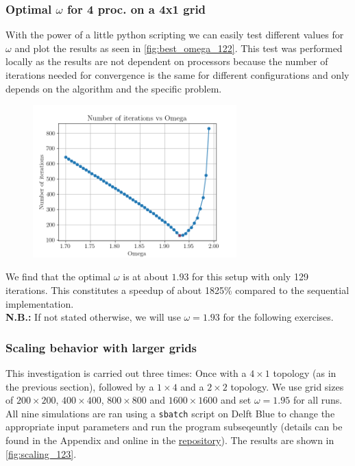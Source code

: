 \subsubsection{Optimal $\omega$ for 4 proc. on a 4x1 grid}
\label{subsec:optimal_omega}
With the power of a little python scripting we can easily test different values for $\omega$ and plot the results as seen in \autoref{fig:best_omega_122}. This test was performed locally as the results are not dependent on processors because the number of iterations needed for convergence is the same for different configurations and only depends on the algorithm and the specific problem.

\begin{figure}[H]
    \centering
    \includegraphics[width=0.7\textwidth]{../fig/lab1/best_omega_122.png}
    \caption{}
    \label{fig:best_omega_122}
\end{figure}
We find that the optimal $\omega$ is at about $1.93$ for this setup with only 129 iterations. This constitutes a speedup of about 1825\% compared to the sequential implementation. \\

\textbf{N.B.:} If not stated otherwise, we will use $\omega = 1.93$ for the following exercises. 

\subsubsection{Scaling behavior with larger grids}
\label{subsec:scaling}
This investigation is carried out three times: Once with a $4\times 1$ topology (as in the previous section), followed by a $1\times 4$ and a $2\times 2$ topology. We use grid sizes of $200\times 200$, $400\times 400$, $800\times 800$ and $1600\times1600$ and set $\omega = 1.95$ for all runs. All nine simulations are ran using a \texttt{sbatch} script on Delft Blue to change the appropriate input parameters and run the program subseqeuntly (details can be found in the Appendix and online in the \href{https://github.com/etschgi1/HPC}{repository}). The results are shown in \autoref{fig:scaling_123}.

